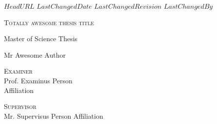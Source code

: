 \svnidlong
{$HeadURL$}
{$LastChangedDate$}
{$LastChangedRevision$}
{$LastChangedBy$}

\thispagestyle{titlepage}

\begin{center}
  \newlength{\parSepLength}
  \setlength{\parSepLength}{10ex}

  \Large
  \centering

  \thinRule\par
  \par\vspace{0.15\parSepLength}
  \begin{minipage}{\textwidth}
    \centering
    \fontsize{40pt}{36pt}\selectfont\titleColor\scshape
    Totally awesome thesis title
  \end{minipage}
  \par\vspace{0.25\parSepLength}
  \par\thinRule

  \vspace{0.125\parSepLength}

  \begin{minipage}{\textwidth}
    \centering
    \small
    Master of Science Thesis
  \end{minipage}

  \vfill

  \begin{minipage}{\textwidth}
    \centering
    \Large
    Mr Awesome Author
  \end{minipage}

  \vfill

  \begin{minipage}{0.8\textwidth}
    \centering
    \small

    \begin{minipage}[t]{0.45\textwidth}
      \textsc{Examiner} \\
      Prof. Examinus Person\\
      Affiliation
    \end{minipage}
    \hfill
    \begin{minipage}[t]{0.45\textwidth}
      \raggedleft
      \textsc{Supervisor} \\
      Mr. Supervisus Person
      Affiliation
    \end{minipage}
  \end{minipage}
\end{center}
